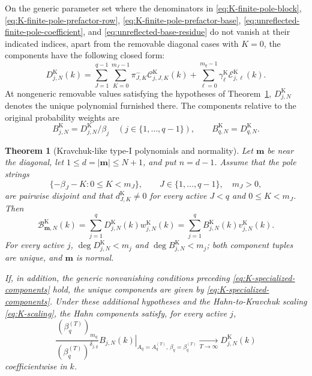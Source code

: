 \documentclass[10pt]{amsart}
\newcommand{\mm}{\boldsymbol m}
\newcommand{\abs}[1]{\lvert#1\rvert}
\theoremstyle{plain}
\newtheorem{theorem}{Theorem}[section]
\theoremstyle{definition}
\theoremstyle{remark}
\begin{document}
On the generic parameter set where the denominators in
\eqref{eq:K-finite-pole-block},
\eqref{eq:K-finite-pole-prefactor-row},
\eqref{eq:K-finite-pole-prefactor-base},
\eqref{eq:unreflected-finite-pole-coefficient}, and
\eqref{eq:unreflected-base-residue} do not vanish at their indicated
indices, apart from the removable diagonal cases with \(K=0\), the
components have the following closed form:
\begin{equation}
 D_{j,N}^{\mathrm K}(k)=
 \sum_{J=1}^{q-1}\sum_{K=0}^{m_J-1}
 \pi_{J,K}^{-}\mathcal C_{j,J,K}^{\mathrm K}(k)
 +\sum_{\ell=0}^{m_q-1}
 \gamma_\ell^{\mathrm K}\mathcal E_{j,\ell}^{\mathrm K}(k).
 \label{eq:K-specialized-components}
\end{equation}
At nongeneric removable values satisfying the hypotheses of
Theorem~\ref{thm:K-components}, \(D_{j,N}^{\mathrm K}\) denotes the unique
polynomial furnished there.
The components relative to the original probability weights are
\begin{equation}
 B_{j,N}^{\mathrm K}=D_{j,N}^{\mathrm K}/\beta_j
 \quad(j\in\{1,\ldots,q-1\}),\qquad
 B_{q,N}^{\mathrm K}=D_{q,N}^{\mathrm K}.
 \label{eq:K-probability-components}
\end{equation}

\begin{theorem}[Kravchuk-like type-I polynomials and normality]
\label{thm:K-components}
Let \(\mm\) be near the diagonal, let
\(1\le d=\abs\mm\le N+1\), and put \(n=d-1\). Assume that the pole strings
\[
 \{-\beta_J-K:0\le K<m_J\},
 \qquad J\in\{1,\ldots,q-1\},\quad m_J>0,
\]
are pairwise disjoint and that \(d_{J,K}^{\mathrm K}\ne0\) for every
active \(J<q\) and \(0\le K<m_J\).
Then
\begin{equation}
 \mathcal B_{\mm,N}^{\mathrm K}(k)
 =\sum_{j=1}^qD_{j,N}^{\mathrm K}(k)w_{j,N}^{\mathrm K}(k)
 =\sum_{j=1}^qB_{j,N}^{\mathrm K}(k)v_{j,N}^{\mathrm K}(k).
 \label{eq:K-component-decomposition}
\end{equation}
For every active \(j\),
\(\deg D_{j,N}^{\mathrm K}<m_j\) and
\(\deg B_{j,N}^{\mathrm K}<m_j\); both component tuples are unique, and
\(\mm\) is normal.

If, in addition, the generic nonvanishing conditions preceding
\eqref{eq:K-specialized-components} hold, the unique components are given
by \eqref{eq:K-specialized-components}. Under these additional hypotheses
and the Hahn-to-Kravchuk scaling \eqref{eq:K-scaling}, the Hahn
components satisfy, for every active \(j\),
\[
 \frac{(\beta_q^{(T)})_{m_q}}
      {(\beta_q^{(T)})^{\delta_{j,q}}}
 \left.B_{j,N}(k)\right|_{
 A_q=A_q^{(T)},\,\beta_q=\beta_q^{(T)}}
 \xrightarrow[T\to\infty]{}D_{j,N}^{\mathrm K}(k)
\]
coefficientwise in \(k\).
\end{theorem}
\end{document}
